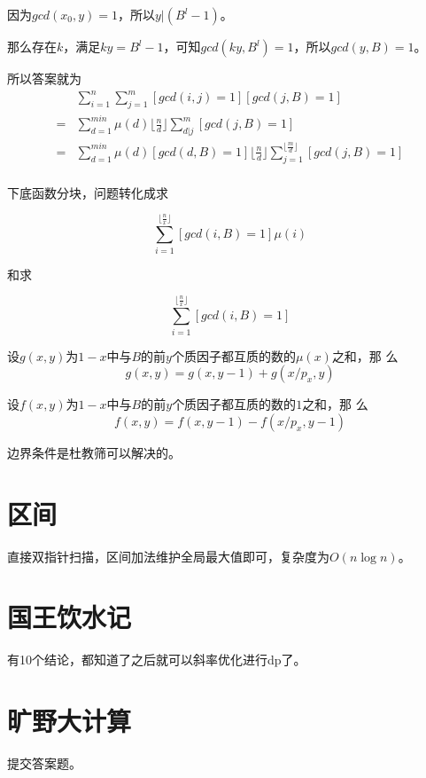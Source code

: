 \documentclass[a4paper]{article}
\begin{document}
因为$gcd(x_0,y)=1$，所以$y|(B^l-1)$。

那么存在$k$，满足$ky=B^l-1$，可知$gcd(ky,B^l)=1$，所以$gcd(y,B)=1$。

所以答案就为
\begin{align*}
  &\sum_{i=1}^n\sum_{j=1}^m[gcd(i,j)=1][gcd(j,B)=1]\\
  =&\sum_{d=1}^{min}\mu(d)\lfloor\frac{n}{d}\rfloor\sum_{d|j}^{m}[gcd(j,B)=1]\\
  =&\sum_{d=1}^{min}\mu(d)[gcd(d,B)=1]\lfloor\frac{n}{d}\rfloor\sum_{j=1}^{\lfloor\frac{m}{d}\rfloor}[gcd(j,B)=1]\\
\end{align*}

下底函数分块，问题转化成求

$$\sum_{i=1}^{\lfloor\frac{n}{x}\rfloor}[gcd(i,B)=1]\mu(i)$$

和求

$$\sum_{i=1}^{\lfloor\frac{n}{x}\rfloor}[gcd(i,B)=1]$$

设$g(x,y)$为$1-x$中与$B$的前$y$个质因子都互质的数的$\mu(x)$之和，那
么$$g(x,y)=g(x,y-1)+g(x/p_x,y)$$

设$f(x,y)$为$1-x$中与$B$的前$y$个质因子都互质的数的$1$之和，那
么$$f(x,y)=f(x,y-1)-f(x/p_x,y-1)$$

边界条件是杜教筛可以解决的。

\section{区间}

直接双指针扫描，区间加法维护全局最大值即可，复杂度为$O(n\log n)$。

\section{国王饮水记}

有10个结论，都知道了之后就可以斜率优化进行dp了。

\section{旷野大计算}

提交答案题。
\end{document}
